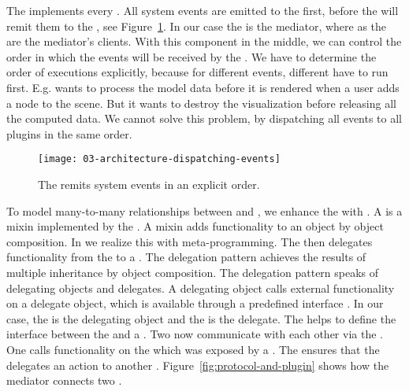 \documentclass[../../ClassicThesis.tex]{subfiles}
\begin{document}
The  implements every . All system
events are emitted to the  first, before the
 will remit them to the , see
Figure~\ref{fig:dispatching-events}. In our case the
 is the mediator, where as the  are
the mediator's clients. With this component in the middle, we can
control the order in which the events will be received by the
. We have to determine the order of 
executions explicitly, because for different events, different
 have to run first. E.g. {\platener} wants to process
the model data before it is rendered when a user adds a node to the
scene. But it wants to destroy the visualization before releasing all
the computed data. We cannot solve this problem, by dispatching all
events to all plugins in the same order.

\begin{figure}[h]
  \centering
  \texttt{[image: 03-architecture-dispatching-events]}
  \caption{The  remits system events in an explicit order.}
  \label{fig:dispatching-events}
\end{figure}

To model many-to-many relationships between  and
, we enhance the  with
. A  is a mixin implemented by the
. A mixin adds functionality to an object by object
composition\cite[p.~81]{js-design-patterns}. In {\javascript}
we realize this with meta-programming. The  then
delegates functionality from the  to a
.
The delegation pattern achieves the results of multiple inheritance by
object composition. The delegation pattern speaks of delegating
objects and delegates. A delegating object calls external
functionality on a delegate object, which is available through a
predefined interface \cite{delegation-pattern}. In our case, the
 is the delegating object and the  is
the delegate. The  helps to define the interface
between the  and a . Two
 now communicate with each other via the
. One  calls functionality on the
 which was exposed by a . The
 ensures that the  delegates an
action to another . Figure~\ref{fig:protocol-and-plugin}
shows how the mediator connects two .
\end{document}

